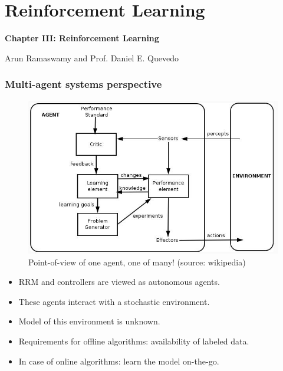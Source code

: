 \documentclass{beamer}
\begin{document}
\section{Reinforcement Learning}
\begin{frame}
\centerline{\textbf{Chapter III: Reinforcement Learning}}
\begin{center}
 Arun Ramaswamy and Prof. Daniel E. Quevedo
\end{center}

\end{frame}
\begin{frame}
 \frametitle{Multi-agent systems perspective}
 \begin{figure}
\centering
\includegraphics[height= .3 \textheight, width=.6\textwidth]{ncs2}
\caption{{\footnotesize Point-of-view of one agent, one of many! (source: wikipedia)}} 
\label{fig2}
\end{figure}
\vspace*{-.3in}
\begin{itemize}
 \item RRM and controllers are viewed as autonomous agents.
 \item These agents interact with a stochastic environment.
 \item Model of this environment is {\color{blue} unknown}.
 \item Requirements for offline algorithms: {\color{blue}availability of labeled data}. 
 \item In case of online algorithms: {\color{blue} learn the model on-the-go}.
\end{itemize}
\end{frame}
\end{document}
